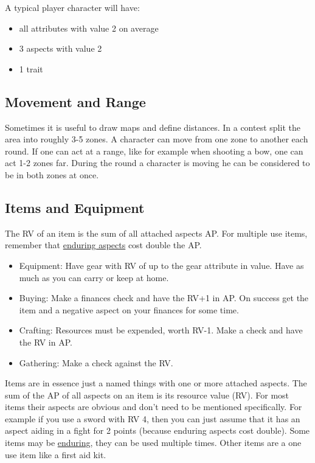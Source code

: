 \documentclass[11pt]{article}
\begin{document}
{\begin{short}
A typical player character will have:
\begin{itemize}
\item all attributes with value 2 on average
\item 3 aspects with value 2
\item 1 trait
\end{itemize}
\end{short}
\subsection{Movement and Range}
\label{sec:org453a0b7}
\begin{short}
Sometimes it is useful to draw maps and define distances. In a contest split the area into roughly 3-5 zones. A character can move from one zone to another each round. If one can act at a range, like for example when shooting a bow, one can act 1-2 zones far. During the round a character is moving he can be considered to be in both zones at once.
\end{short}
\subsection{Items and Equipment}
\label{sec:org05c1ef1}
\begin{short}
The RV of an item is the sum of all attached aspects AP. For multiple use items, remember that \hyperref[sec:orgd783730]{enduring aspects} cost double the AP.
\begin{itemize}
\item Equipment: Have gear with RV of up to the gear attribute in value. Have as much as you can carry or keep at home.
\item Buying: Make a finances check and have the RV+1 in AP. On success get the item and a negative aspect  on your finances for some time.
\item Crafting: Resources must be expended, worth RV-1. Make a check and have the RV in AP.
\item Gathering: Make a check against the RV.
\end{itemize}
\end{short}

Items are in essence just a named things with one or more attached aspects. The sum of the AP of all aspects on an item is its resource value (RV). For most items their aspects are obvious and don't need to be mentioned specifically. For example if you use a sword with RV 4, then you can just assume that it has an aspect aiding in a fight for 2 points (because enduring aspects cost double). Some items may be \hyperref[sec:orgd783730]{enduring}, they can be used multiple times. Other items are a one use item like a first aid kit. 

}
\end{document}
